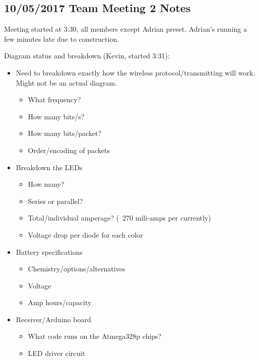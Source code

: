 \documentclass[12pt]{article}
\begin{document}
	\clearpage

	\subsection{10/05/2017 Team Meeting 2 Notes}

		\noindent
		Meeting started at 3:30, all members except Adrian preset. Adrian’s running a few minutes late due to construction.

		\noindent
		Diagram status and breakdown (Kevin, started 3:31):

		\noindent
		\begin{itemize}
			\item Need to breakdown exactly how the wireless protocol/transmitting will work. Might not be an actual diagram. 
				\begin{itemize}
					\item What frequency?
					\item How many bits/s?
					\item How many bits/packet?
					\item Order/encoding of packets
				\end{itemize}
			\item Breakdown the LEDs
				\begin{itemize}
					\item How many?
					\item Series or parallel?
					\item Total/individual amperage? (~270 mili-amps per currently)
					\item Voltage drop per diode for each color
				\end{itemize}
			\item Battery specifications
				\begin{itemize}
					\item Chemistry/options/alternatives
					\item Voltage
					\item Amp hours/capacity
				\end{itemize}
			\item Receiver/Arduino board
				\begin{itemize}
					\item What code runs on the Atmega328p chips?
					\item LED driver circuit
				\end{itemize}

		\end{itemize}
\end{document}
